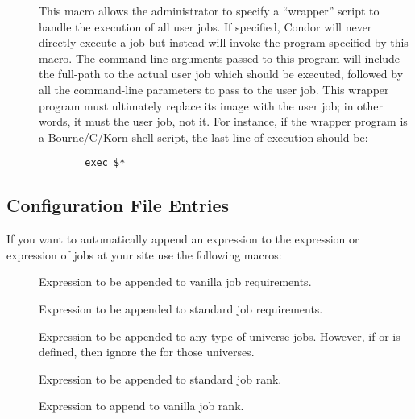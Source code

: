 \begin{description}
\item[] \label{param:UserJobWrapper} This macro
  allows the administrator to specify a ``wrapper'' script to handle the
  execution of all user jobs.  
  If specified, Condor will never directly execute a job but instead will
  invoke the program specified by this macro.
  The command-line arguments passed to this program will include the
  full-path to the actual user job which should be executed, followed by all
  the command-line parameters to pass to the user job.
  This wrapper program must ultimately replace its image with the user job;
  in other words, it must  the user job, not  it.
  For instance, if the wrapper program is a Bourne/C/Korn shell script, the
  last line of execution should be:
\begin{verbatim}
        exec $*
\end{verbatim}

\end{description}

\subsection{\label{sec:Submit-Config-File-Entries}
 Configuration File Entries}

If you want  to automatically append an expression to
the  expression or  expression of 
jobs at your site use the following macros:
\begin{description}
  
\item[] \label{param:AppendReqVanilla}
  Expression to be appended to vanilla job requirements.
  
\item[] \label{param:AppendReqStandard}
  Expression to be appended to standard job requirements.

\item[] \label{param:AppendReqStandard}
  Expression to be appended to any type of universe jobs. 
  However, if  or 
  is defined, then ignore the  for those
  universes.

\item[] \label{param:AppendRankStandard}
  Expression to be appended to standard job rank.

\item[] \label{param:AppendRankStandard}
  Expression to append to vanilla job rank.

\end{description}

